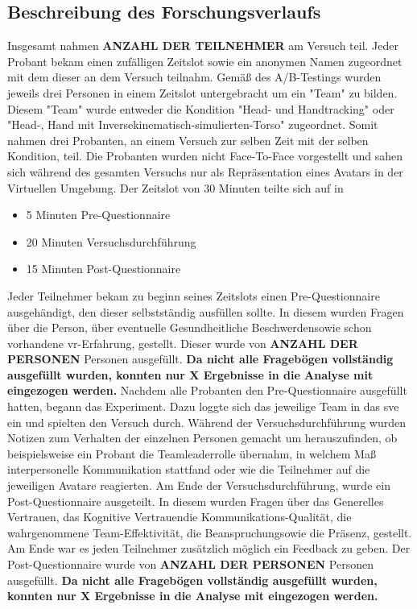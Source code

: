 \documentclass[a4paper,11pt]{article}%
\renewcommand{\\}{\vspace*{0.5\baselineskip} \newline}
\begin{document}
		\subsection{Beschreibung des Forschungsverlaufs}
		Insgesamt nahmen \textbf{ANZAHL DER TEILNEHMER} am Versuch teil.
Jeder Probant bekam einen zufälligen Zeitslot sowie ein anonymen Namen zugeordnet mit dem dieser an dem Versuch teilnahm. Gemäß des A/B-Testings wurden jeweils drei Personen in einem Zeitslot untergebracht um ein "Team" zu bilden. Diesem "Team" wurde entweder die Kondition "Head- und Handtracking" oder "Head-, Hand mit Inversekinematisch-simulierten-Torso" zugeordnet. Somit nahmen drei Probanten, an einem Versuch zur selben Zeit mit der selben Kondition, teil. Die Probanten wurden nicht Face-To-Face vorgestellt und sahen sich während des gesamten Versuchs nur als Repräsentation eines Avatars in der Virtuellen Umgebung. Der Zeitslot von 30 Minuten teilte sich auf in
		\begin{itemize}
			\item 5 Minuten Pre-Questionnaire
			\item 20 Minuten Versuchsdurchführung
			\item 15 Minuten Post-Questionnaire
		\end{itemize}
		Jeder Teilnehmer bekam zu beginn seines Zeitslots einen Pre-Questionnaire ausgehändigt, den dieser selbstständig ausfüllen sollte. In diesem wurden Fragen über die \flqq Person\frqq, über eventuelle \flqq Gesundheitliche Beschwerden\frqq sowie schon vorhandene \flqq \ac{vr}-Erfahrung\frqq, gestellt.
		Dieser wurde von \textbf{ANZAHL DER PERSONEN} Personen ausgefüllt. \textbf{Da nicht alle Fragebögen vollständig ausgefüllt wurden, konnten nur X Ergebnisse in die Analyse mit eingezogen werden.}
		Nachdem alle Probanten den Pre-Questionnaire ausgefüllt hatten, begann das Experiment. Dazu loggte sich das jeweilige Team in das \ac{sve} ein und spielten den Versuch durch.
		Während der Versuchsdurchführung wurden Notizen zum Verhalten der einzelnen Personen gemacht um herauszufinden, ob beispielsweise ein Probant die Teamleaderrolle übernahm, in welchem Maß interpersonelle Kommunikation stattfand oder wie die Teilnehmer auf die jeweiligen Avatare reagierten.
		Am Ende der Versuchsdurchführung, wurde ein Post-Questionnaire ausgeteilt. In diesem wurden Fragen über das \flqq Generelles Vertrauen\frqq, das \flqq Kognitive Vertrauen\frqq die \flqq Kommunikations-Qualität\frqq, die wahrgenommene \flqq Team-Effektivität\frqq, die \flqq Beanspruchung\frqq sowie die \flqq Präsenz\frqq, gestellt. Am Ende war es jeden Teilnehmer zusätzlich möglich ein Feedback zu geben. Der Post-Questionnaire wurde von \textbf{ANZAHL DER PERSONEN} Personen ausgefüllt. \textbf{Da nicht alle Fragebögen vollständig ausgefüllt wurden, konnten nur X Ergebnisse in die Analyse mit eingezogen werden.}
		
\end{document}
